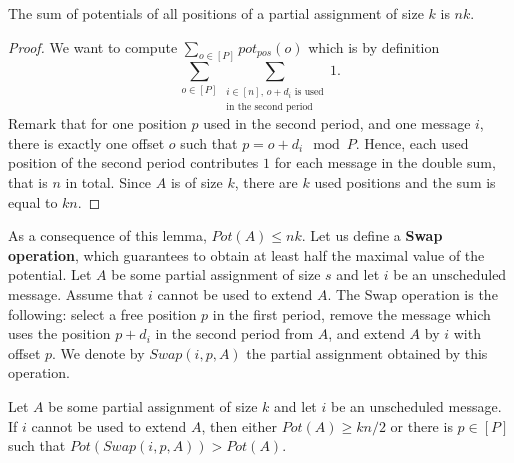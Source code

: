 \documentclass[a4paper,UKenglish,cleveref, autoref, thm-restate]{lipics-v2019}
\begin{document}
\begin{lemma}\label{lemma:inv}
The sum of potentials of all positions of a partial assignment of size $k$ is $nk$.  
\end{lemma}
\begin{proof}
We want to compute $\sum_{o \in [P]} pot_{pos}(o)$ which is by definition
$$\sum_{o \in [P]} \sum_{\substack {i \in [n],\, o + d_i \text{ is used} \\ \text{in the second period}}} 1.$$
Remark that for one position $p$ used in the second period, and one message $i$, there is exactly one offset $o$ such that $p = o+d_i \mod P$.
Hence, each used position of the second period contributes $1$ for each message in the double sum, that is $n$ in total.
Since $A$ is of size $k$, there are $k$ used positions and the sum is equal to $kn$.
\end{proof}

 As a consequence of this lemma, $Pot(A) \leq nk$. Let us define a \textbf{Swap operation},
 which guarantees to obtain at least half the maximal value of the potential.
Let $A$ be some partial assignment of size $s$ and let $i$ be an unscheduled message. 
Assume that $i$ cannot be used to extend $A$. The Swap operation is the following: 
select a free position $p$ in the first period, remove the message which uses the position $p+d_i$ in the second period from $A$, and extend $A$ by $i$ with offset $p$. We denote by $Swap(i,p,A)$ the partial assignment obtained by this operation.

\begin{lemma}\label{lemma:swap}
Let $A$ be some partial assignment of size $k$ and let $i$ be an unscheduled message. If $i$ cannot be used to extend $A$, then either $Pot(A) \geq kn/2$ or there is $p \in [P]$ such that $Pot(Swap(i,p,A)) > Pot(A)$.
\end{lemma}
\end{document}
